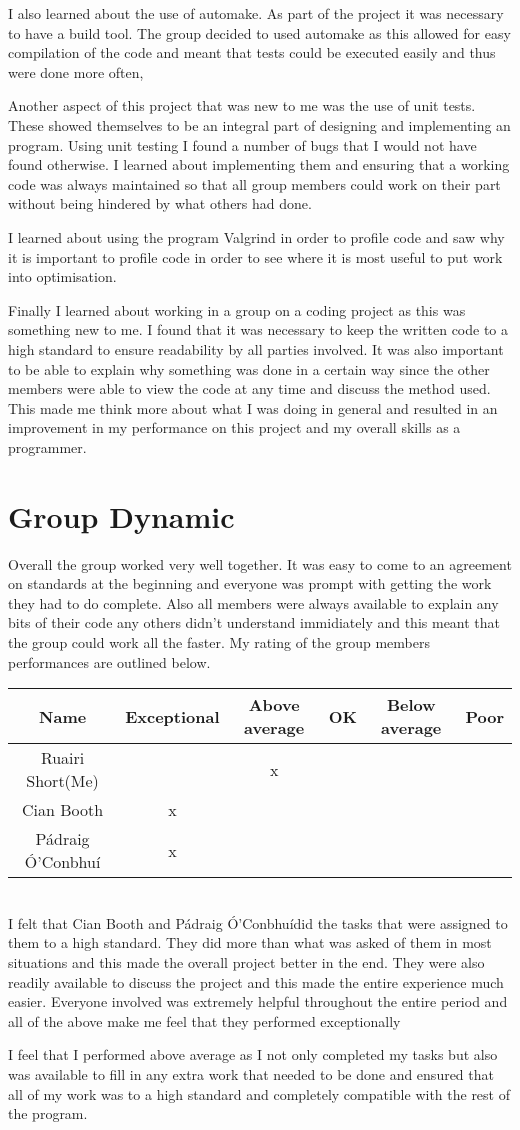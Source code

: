 \documentclass[12pt]{article}    %
\numberwithin{equation}{section}
\newcommand{\pa}{P\'{a}draig \'{O}'Conbhu\'{i}}
\begin{document}
I also learned about the use of automake.
As part of the project it was necessary to have a build tool.
The group decided to used automake as this allowed for easy compilation of the code and meant that tests could be executed easily and thus were done more often,

Another aspect of this project that was new to me was the use of unit tests.
These showed themselves to be an integral part of designing and implementing an program.
Using unit testing I found a number of bugs that I would not have found otherwise.
I learned about implementing them and ensuring that a working code was always maintained so that all group members could work on their part without being hindered by what others had done.

I learned about using the program Valgrind in order to profile code and saw why it is important to profile code in order to see where it is most useful to put work into optimisation.

Finally I learned about working in a group on a coding project as this was something new to me.
I found that it was necessary to keep the written code to a high standard to ensure readability by all parties involved.
It was also important to be able to explain why something was done in a certain way since the other members were able to view the code at any time and discuss the method used.
This made me think more about what I was doing in general and resulted in an improvement in my performance on this project and my overall skills as a programmer.


\section{Group Dynamic}
Overall the group worked very well together. 
It was easy to come to an agreement on standards at the beginning and everyone was prompt with getting the work they had to do complete.
Also all members were always available to explain any bits of their code any others didn't understand immidiately and this meant that the group could work all the faster.
My rating of the group members performances are outlined below.

\begin{tabular}{|c|c|c|c|c|c|}
\hline
Name & Exceptional & Above average & OK & Below average & Poor\\
\hline\hline
Ruairi Short(Me) & & x& & &\\ 
\hline
Cian Booth & x& & & &\\
\hline
\pa & x& & & &\\
\hline
\end{tabular}
\\
I felt that Cian Booth and \pa did the tasks that were assigned to them to a high standard.
They did more than what was asked of them in most situations and this made the overall project better in the end.
They were also readily available to discuss the project and this made the entire experience much easier.
Everyone involved was extremely helpful throughout the entire period and all of the above make me feel that they performed exceptionally

I feel that I performed above average as I not only completed my tasks but also was available to fill in any extra work that needed to be done and ensured that all of my work was to a high standard and completely compatible with the rest of the program.
\end{document}
